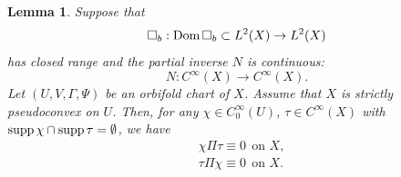 \documentclass{article}
\newtheorem{lemma}[theorem]{Lemma}
\begin{document}
\begin{lemma}\label{l-gue251206yyd}
Suppose  that \[\square_b: {\rm Dom\,}\square_b\subset L^2(X)\rightarrow L^2(X)\]
has closed range and the partial inverse $N$ is continuous:
\[N: C^\infty(X)\rightarrow C^\infty(X).\]
Let $(U, V, \Gamma, \Psi)$
be an orbifold chart of $X$. Assume that $X$ is strictly pseudoconvex on $U$. Then, for any $\chi\in C^\infty_0(U)$, $\tau\in C^\infty(X)$ with 
${\rm supp\,}\chi\cap{\rm supp\,}\tau=\emptyset$, we have 
\begin{equation}\label{e-gue251209yyds}\begin{split}
    &\chi\Pi\tau\equiv0\ \ \mbox{on $X$},\\
    &\tau\Pi\chi\equiv0\ \ \mbox{on $X$}.
\end{split}
\end{equation}
\end{lemma} 
\end{document}
